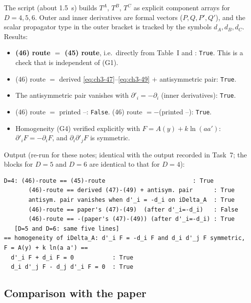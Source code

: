 The script  (about 1.5~s) builds $T^A$, $T^B$, $T^C$ as explicit component arrays for $D=4,5,6$. Outer and inner derivatives
are formal vectors ($P,Q,P',Q'$), and the scalar propagator type in the outer bracket is tracked by the symbols $d_A,d_B,d_C$. Results:
\begin{itemize}[leftmargin=14pt]
\item \textbf{(46) route $=$ (45) route}, i.e.\ directly from Table~I and : \texttt{True}. This is a check that is independent of (G1).
\item (46) route $=$ derived \eqref{eq:ch3-47}--\eqref{eq:ch3-49} $+$ antisymmetric pair: \texttt{True}.
\item The antisymmetric pair vanishes with $\partial'_i=-\partial_i$ (inner derivatives): \texttt{True}.
\item (46) route $=$ printed --: \texttt{False}. (46) route $=-$(printed --): \texttt{True}.
\item Homogeneity (G4) verified explicitly with $F=A(y)+k\ln(aa')$: $\partial'_iF=-\partial_iF$, and $\partial_i\partial'_jF$ is symmetric.
\end{itemize}
Output (re-run for these notes; identical with the output recorded in Task~7; the blocks for $D=5$ and $D=6$ are identical to that for $D=4$):
{\footnotesize
\begin{verbatim}
D=4: (46)-route == (45)-route                         : True
       (46)-route == derived (47)-(49) + antisym. pair      : True
       antisym. pair vanishes when d'_i = -d_i on iDelta_A  : True
       (46)-route == paper's (47)-(49)  (after d'_i=-d_i)   : False
       (46)-route == -(paper's (47)-(49)) (after d'_i=-d_i) : True
   [D=5 and D=6: same five lines]
== homogeneity of iDelta_A: d'_i F = -d_i F and d_i d'_j F symmetric, F = A(y) + k ln(a a') ==
  d'_i F + d_i F = 0           : True
  d_i d'_j F - d_j d'_i F = 0  : True
\end{verbatim}
}

\subsection{Comparison with the paper}
\label{sec:ch3-t7-compare}

